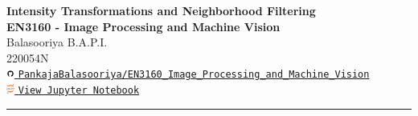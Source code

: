 \documentclass[11pt]{article}
\begin{document}
\begin{center}
    {\LARGE \textbf{Intensity Transformations and Neighborhood Filtering}}\\[0.5cm]
    {\large \textbf{EN3160 - Image Processing and Machine Vision}}\\[0.5cm]
    {Balasooriya B.A.P.I.} \\
    220054N \\[0.3cm]
    \href{https://github.com/PankajaBalasooriya/EN3160_Image_Processing_and_Machine_Vision.git}{%
        \includegraphics[width=0.02\textwidth]{resources/github-mark.png}\hspace{0.5em}%
        \texttt{PankajaBalasooriya/EN3160\_Image\_Processing\_and\_Machine\_Vision}%
    }\\[0.3cm]
    
    \href{https://github.com/PankajaBalasooriya/EN3160_Image_Processing_and_Machine_Vision/blob/main/Assignments/Assignment1_PointOperationsAndSpatialFiltering/assignment1.ipynb}{%
        \includegraphics[width=0.02\textwidth]{resources/jupyter-icon.png}\hspace{0.5em}%
        \texttt{View Jupyter Notebook}%
    }
    
\end{center}
\hrule
    
    
    
    
    
\end{document}
